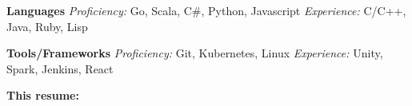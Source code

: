 



  \vspace{5pt}
  \textbf{Languages}\quad
    \emph{Proficiency:} Go, Scala, C\#, Python, Javascript
    \quad
    \emph{Experience:} C/C++, Java, Ruby, Lisp

  \vspace{5pt}
  \textbf{Tools/Frameworks}\quad
    \emph{Proficiency:} Git, Kubernetes, Linux
    \quad
    \emph{Experience:} Unity, Spark, Jenkins, React

  \vspace{5pt}




  \textbf{This resume:}\enspace


